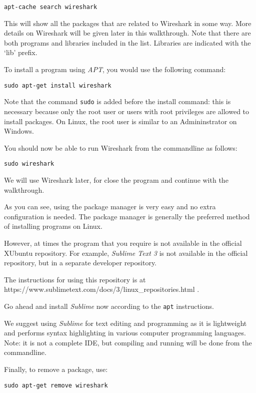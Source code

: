 \documentclass[a4paper]{article}
\begin{document}
\begin{lstlisting}
apt-cache search wireshark
\end{lstlisting}

This will show all the packages that are related to Wireshark in some way. More details on Wireshark will be given later in this walkthrough. Note that there are both programs and libraries included in the list. Libraries are indicated with the `lib' prefix.

To install a program using \emph{APT}, you would use the following command: 
\begin{lstlisting}
sudo apt-get install wireshark
\end{lstlisting}

Note that the command \texttt{sudo} is added before the install command: this is necessary because only the root user or users with root privileges are allowed to install packages. On Linux, the root user is similar to an Admininstrator on Windows. 

You should now be able to run Wireshark from the commandline as follows:
\begin{lstlisting}
sudo wireshark
\end{lstlisting}

We will use Wireshark later, for close the program and continue with the walkthrough. 

As you can see, using the package manager is very easy and no extra configuration is needed. The package manager is generally the preferred method of installing programs on Linux. 

However, at times the program that you require is not available in the official XUbuntu repository. For example, \emph{Sublime Text 3} is not available in the official repository, but in a separate developer repository. 

The instructions for using this repository is at https://www.sublimetext.com/docs/3/linux\_repositories.html . 

Go ahead and install \emph{Sublime} now according to the \texttt{apt} instructions. 

We suggest using \emph{Sublime} for text editing and programming as it is lightweight and performs syntax highlighting in various computer programming languages. Note: it is not a complete IDE, but compiling and running will be done from the commandline. 

Finally, to remove a package, use:

\begin{lstlisting}
sudo apt-get remove wireshark
\end{lstlisting}
\end{document}
